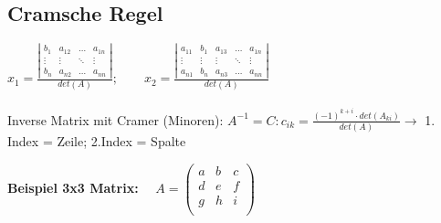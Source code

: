 \subsection{Cramsche Regel}\label{Cramesche Regel}
	$x_1= \frac{\left|\begin{array}{cccc}
		b_1 & a_{12} & \ldots & a_{1n} \\
		\vdots & \vdots & \ddots & \vdots \\
		b_n & a_{n2} & \ldots & a_{nn} \end{array}\right|}{det(A)}; \qquad
	x_2 = \frac{\left|\begin{array}{ccccc}
		a_{11} & b_1 & a_{13} & \ldots & a_{1n}\\
		\vdots & \vdots & \vdots & \ddots & \vdots \\
		a_{n1} & b_n & a_{n3} & \ldots & a_{nn} \end{array}\right|}{det(A)}$ \\ \\
	Inverse Matrix mit Cramer (Minoren): $A^{-1} = C : c_{ik} = \frac{(-1)^{k+i} \cdot det(A_{ki})}{det(A)} \longrightarrow$ 1. Index = Zeile; 2.Index = Spalte
	
	\textbf{Beispiel 3x3 Matrix:} \ \ 
		$A=\left(\begin{array}{rrr} 
				a & b & c \\
				d & e & f \\
				g & h & i \\
			\end{array}\right)$ \\ \ \\
			
